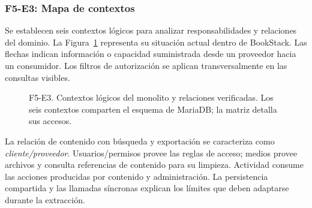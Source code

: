 \subsubsection{F5-E3: Mapa de contextos}
Se establecen seis contextos lógicos para analizar responsabilidades y
relaciones del dominio. La Figura~\ref{fig:f5-e3-contextos} representa su
situación actual dentro de BookStack. Las flechas indican información o
capacidad suministrada desde un proveedor hacia un consumidor. Los filtros
de autorización se aplican transversalmente en las consultas visibles.

\begin{figure}[H]
\centering
{}
\caption{F5-E3. Contextos lógicos del monolito y relaciones verificadas. Los seis contextos comparten el esquema de MariaDB; la matriz detalla sus accesos.}
\label{fig:f5-e3-contextos}
\end{figure}

\begin{samepage}
La relación de contenido con búsqueda y exportación se caracteriza como
\textit{cliente/proveedor}. Usuarios/permisos provee las reglas de acceso;
medios provee archivos y consulta referencias de contenido para su limpieza.
Actividad consume las acciones producidas por contenido y administración.
La persistencia compartida y las llamadas síncronas explican los límites
que deben adaptarse durante la extracción.
\end{samepage}

